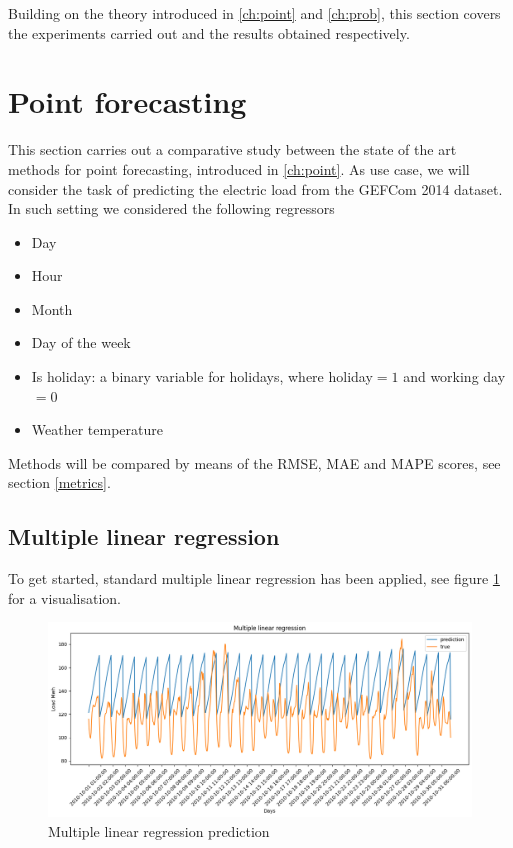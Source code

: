Building on the theory introduced in \ref{ch:point} and \ref{ch:prob}, this section covers the experiments carried out and the results obtained respectively.


\section{Point forecasting}
This section carries out a comparative study between the state of the art methods for point forecasting, introduced in \ref{ch:point}.
As use case, we will consider the task of predicting the electric load from the GEFCom 2014 dataset.
In such setting we considered the following regressors
\begin{itemize}
    \item Day
    \item Hour
    \item Month
    \item Day of the week
    \item Is holiday: a binary variable for holidays, where holiday$=1$ and working day$=0$
    \item Weather temperature
\end{itemize}
Methods will be compared by means of the RMSE, MAE and MAPE scores, see section \ref{metrics}.
\subsection{Multiple linear regression}
To get started, standard multiple linear regression has been applied, see figure \ref{fig:mlr_price} for a visualisation. 
\begin{figure}
    \includegraphics[width=\textwidth]{images/mlr_price.png}
    \caption{Multiple linear regression prediction}
    \label{fig:mlr_price}
\end{figure}

